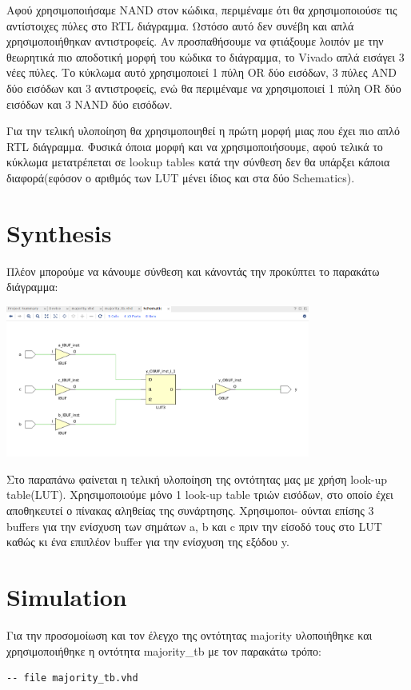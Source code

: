 \documentclass[]{article}
\begin{document}
Αφού χρησιμοποιήσαμε NAND στον κώδικα, περιμέναμε ότι θα χρησιμοποιούσε τις αντίστοιχες πύλες στο RTL διάγραμμα.
Ωστόσο αυτό δεν συνέβη και απλά χρησιμοποιήθηκαν αντιστροφείς. Αν προσπαθήσουμε να φτιάξουμε λοιπόν με την θεωρητικά
πιο αποδοτική μορφή του κώδικα το διάγραμμα, το Vivado απλά εισάγει 3 νέες πύλες. Το κύκλωμα αυτό χρησιμοποιεί 1 πύλη OR δύο εισόδων, 3 πύλες AND δύο εισόδων και 3 αντιστροφείς,
ενώ θα περιμέναμε να χρησιμοποιεί 1 πύλη OR δύο εισόδων και 3 NAND δύο εισόδων.

Για την τελική υλοποίηση θα χρησιμοποιηθεί η πρώτη μορφή μιας που έχει πιο απλό RTL διάγραμμα.
Φυσικά όποια μορφή και να χρησιμοποιήσουμε, αφού τελικά το κύκλωμα μετατρέπεται σε lookup tables κατά την σύνθεση δεν θα υπάρξει κάποια διαφορά(εφόσον ο αριθμός των LUT μένει ίδιος και στα δύο Schematics).

\section{Synthesis}
Πλέον μπορούμε να κάνουμε σύνθεση και κάνοντάς την προκύπτει το παρακάτω διάγραμμα:
\begin{center}
	\includegraphics[width=10cm]{synthesis_schem.png}
\end{center}

Στο παραπάνω φαίνεται η τελική υλοποίηση της οντότητας μας με χρήση look-up table(LUT). Χρησιμοποιούμε μόνο
1 look-up table τριών εισόδων, στο οποίο έχει αποθηκευτεί ο πίνακας αληθείας της συνάρτησης. Χρησιμοποι-
ούνται επίσης 3 buffers για την ενίσχυση των σημάτων a, b και c πριν την είσοδό τους στο LUT καθώς κι ένα επιπλέον buffer για την ενίσχυση της εξόδου y.

\section{Simulation}
Για την προσομοίωση και τον έλεγχο της οντότητας majority υλοποιήθηκε και χρησιμοποιήθηκε η οντότητα majority\_tb με τον παρακάτω τρόπο:
\begin{verbatim}
-- file majority_tb.vhd
\end{verbatim}
\inputminted{vhdl}{./assign_1/majority_tb.vhdl}
\end{document}
